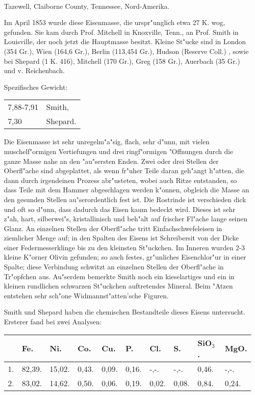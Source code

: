 \documentclass[a4paper, 11pt, oneside]{article}
\begin{document}
\paragraph{}
Tazewell, Claiborne County, Tennessee, Nord-Amerika.

Im April 1853 wurde diese Eisenmasse, die urspr"unglich etwa 27 K. wog, gefunden. Sie kam durch Prof. Mitchell in Knoxville, Tenn., an Prof. Smith in Louisville, der noch jetzt die Hauptmasse besitzt. Kleine St"ucke sind in London (354 Gr.), Wien (164,6 Gr.), Berlin (113,454 Gr.), Hudson (Reserve Coll.) , sowie bei Shepard (1 K. 416), Mitchell (170 Gr.), Greg (158 Gr.), Auerbach (35 Gr.) und v. Reichenbach.

Spezifisches Gewicht:  
\begin{table}[!ht]
    \centering
    \begin{tabular}{l l}
        7,88-7,91 & Smith,\\
        7,30 & Shepard.
    \end{tabular}
\end{table}

Die Eisenmasse ist sehr unregelm"a"sig, flach, sehr d"unn, mit vielen muschelf"ormigen Vertiefungen und drei ringf"ormigen "Offnungen durch die ganze Masse nahe an den "au"sersten Enden. Zwei oder drei Stellen der Oberfl"ache sind abgeplattet, als wenn fr"uher Teile daran geh"angt h"atten, die dann durch irgendeinen Prozess abr"usteten, wobei auch Ritze entstanden, so dass Teile mit dem Hammer abgeschlagen werden k"onnen, obgleich die Masse an den gesunden Stellen au"serordentlich fest ist. Die Rostrinde ist verschieden dick und oft so d"unn, dass dadurch das Eisen kaum bedeckt wird. Dieses ist sehr z"ah, hart, silberwei"s, kristallinisch und beh"alt auf frischer Fl"ache lange seinen Glanz. An einzelnen Stellen der Oberfl"ache tritt Einfachschwefeleisen in ziemlicher Menge auf; in den Spalten des Eisens ist Schreibersit von der Dicke einer Federmesserklinge bis zu den kleinsten St"uckchen. Im Inneren wurden 2-3 kleine K"orner Olivin gefunden; so auch festes, gr"unliches Eisenchlor"ur in einer Spalte; diese Verbindung schwitzt an einzelnen Stellen der Oberfl"ache in Tr"opfchen aus. Au"serdem bemerkte Smith noch ein kieselartiges und ein in kleinen rundlichen schwarzen St"uckchen auftretendes Mineral. Beim "Atzen entstehen sehr sch"one Widmannst"atten'sche Figuren.

Smith und Shepard haben die chemischen Bestandteile dieses Eisens untersucht. Ersterer fand bei zwei Analysen:
\begin{table}[H]
    \centering
    \begin{tabular}{l l l l l l l l l l}
         & Fe. & Ni. & Co. & Cu. & P. & Cl. & S. & SiO$_{3}$. & MgO. \\ \hline
        1. & 82,39. & 15,02. & 0,43. & 0,09. & 0,16. & -,-. & -,-. & 0,46. & -,-. \\
        2. & 83,02. & 14,62. & 0,50. & 0,06. & 0,19. & 0,02. & 0,08. & 0,84. & 0,24. \\
    \end{tabular}
\end{table}
\end{document}
